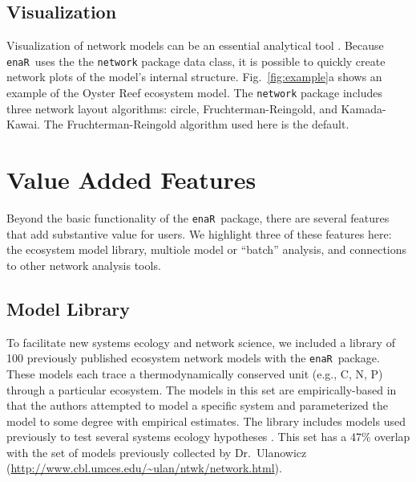 \documentclass[11pt]{article}
\newcommand{\enaR}{\texttt{enaR}}
\begin{document}
\begin{spacing}{2}
\subsection{Visualization}
Visualization of network models can be an essential analytical tool
\citep{moody05dynamic,lima2011visual}.  Because \enaR\ uses the the
\texttt{network} package data class, it is possible to quickly create
network plots of the model's internal structure.
Fig.~\ref{fig:example}a shows an example of the Oyster Reef ecosystem
model.  The \texttt{network} package includes three network layout
algorithms: circle, Fruchterman-Reingold, and Kamada-Kawai.  The
Fruchterman-Reingold algorithm used here is the default.

\section{Value Added Features}
Beyond the basic functionality of the \enaR\ package, there are
several features that add substantive value for users.  We highlight
three of these features here: the ecosystem model library, multiole
model or ``batch'' analysis, and connections to other network analysis
tools.

\subsection{Model Library}
To facilitate new systems ecology and network science, we included a
library of 100 previously published ecosystem network models with the
\enaR\ package. These models each trace a thermodynamically conserved
unit (e.g., C, N, P) through a particular ecosystem.  The models in
this set are empirically-based in that the authors attempted to model
a specific system and parameterized the model to some degree with
empirical estimates.  The library includes models used previously to
test several systems ecology hypotheses \citep{borrett10_idd,
  borrett10_hmg, salas11_did, borrett13}.  This set has a 47\%
overlap with the set of models previously collected by Dr.\ Ulanowicz
(\url{http://www.cbl.umces.edu/~ulan/ntwk/network.html}).


\end{spacing}
\end{document}
